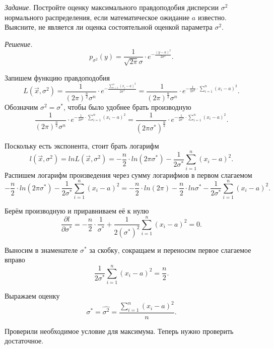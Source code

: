 \textit{Задание.}
Постройте оценку максимального правдоподобия дисперсии $ \sigma^2$ нормального распределения,
если математическое ожидание $a$ известно.
Выясните, не является ли оценка состоятельной оценкой параметра $ \sigma^2$.

\textit{Решение.}
$$p_{ \sigma^2} \left( y \right) =
  \frac{1}{ \sqrt{2 \pi } \sigma } \cdot e^{- \frac{ \left( y - a \right)^2}{2 \sigma^2}}.$$

Запишем функцию правдоподобия
$$L \left( \vec{x}, \sigma^2 \right) =
  \frac{1}{ \left( 2 \pi \right)^{ \frac{n}{2}} \sigma^n} \cdot
  e^{- \frac{ \sum \limits_{i = 1}^n \left( x_i - a \right)^2}{2 \sigma^2}} =
  \frac{1}{ \left( 2 \pi \right)^{ \frac{n}{2}} \sigma^n} \cdot
  e^{- \frac{1}{2 \sigma^2} \cdot \sum \limits_{i = 1}^n \left( x_i - a \right)^2}.$$
Обозначим $ \sigma^2 = \sigma^*$, чтобы было удобнее брать производную
$$ \frac{1}{ \left( 2 \pi \right)^{ \frac{n}{2}} \sigma^n} \cdot
  e^{- \frac{1}{2 \sigma^2} \cdot \sum \limits_{i = 1}^n \left( x_i - a \right)^2} =
  \frac{1}{ \left( 2 \pi \sigma^* \right)^{ \frac{n}{2}}} \cdot
  e^{- \frac{1}{2 \sigma^*} \cdot \sum \limits_{i = 1}^n \left( x_i - a \right)^2}.$$

Поскольку есть экспонента, стоит брать логарифм
$$l \left( \vec{x}, \sigma^2 \right) =
  ln L \left( \vec{x}, \sigma^2 \right) =
  - \frac{n}{2} \cdot ln \left( 2 \pi \sigma^* \right) -
  \frac{1}{2 \sigma^*} \sum \limits_{i = 1}^n \left( x_i - a \right)^2.$$
Распишем логарифм произведения через сумму логарифмов в первом слагаемом
$$- \frac{n}{2} \cdot ln \left( 2 \pi \sigma^* \right) -
  \frac{1}{2 \sigma^*} \sum \limits_{i = 1}^n \left( x_i - a \right)^2 =
  - \frac{n}{2} \cdot ln \left( 2 \pi \right) -
  \frac{n}{2} \cdot ln \sigma^* -
  \frac{1}{2 \sigma^*} \sum \limits_{i = 1}^n \left( x_i - a \right)^2.$$

Берём производную и приравниваем её к нулю
$$ \frac{ \partial l}{ \partial \sigma^*} =
  - \frac{n}{2} \cdot \frac{1}{ \sigma^*} +
  \frac{1}{2 \left( \sigma^* \right)^2} \sum \limits_{i = 1}^n \left( x_i - a \right)^2 =
  0.$$

Выносим в знаменателе $ \sigma^*$ за скобку, сокращаем и переносим первое слагаемое вправо
$$ \frac{1}{2 \sigma^*} \sum \limits_{i = 1}^n \left( x_i - a \right)^2 =
  \frac{n}{2}.$$

Выражаем оценку
$$ \sigma^* =
  \hat{ \sigma^2} =
  \frac{ \sum \limits_{i = 1}^n \left( x_i - a \right)^2}{n}.$$

Проверили необходимое условие для максимума.
Теперь нужно проверить достаточное.

